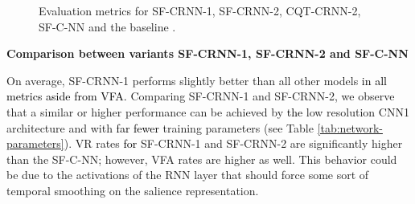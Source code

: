 \documentclass{article}
\newcommand{\jb}[1]{{\textcolor{black}{#1}}}
\newcommand{\jbcor}[2]{{\textcolor{black}{#2}}}
\begin{document}
\begin{figure}
 \centerline{}
 \caption{Evaluation metrics for SF-CRNN-1, SF-CRNN-2, CQT-CRNN-2, SF-C-NN and the baseline \cite{bittner2017_deep}.}
 \label{fig:all-variants-results}
\end{figure}
\vspace{0.15cm}
\hspace{-0.45cm}\textbf{Comparison between variants SF-CRNN-1, SF-CRNN-2 and SF-C-NN}

\hspace{-0.45cm}On average, SF-CRNN-1 performs slightly better than all other models 
\jbcor{in overall, raw pitch, raw chroma accuracy and voicing recall rates.}{in all metrics aside from VFA.}
Comparing SF-CRNN-1 and SF-CRNN-2, we observe that a similar or higher performance can be achieved by \jb{the} low resolution CNN1 architecture and with \jbcor{much less number of}{far fewer} training parameters (see Table \ref{tab:network-parameters}). VR rates \jbcor{of}{for} SF-CRNN-1 and SF-CRNN-2 are significantly higher than the SF-C-NN; however, VFA rates are higher as well. 
This behavior could \jbcor{probably}{} be due to the activations of the RNN layer that should force some sort of temporal smoothing on the salience representation. 
\end{document}
